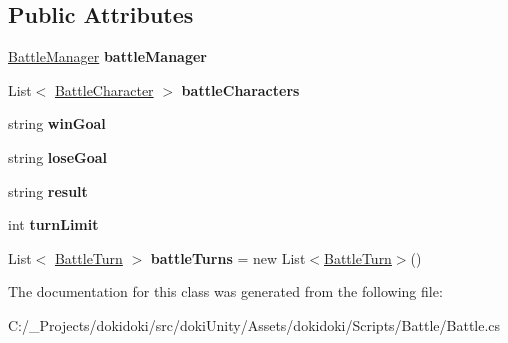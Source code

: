 \subsection*{Public Attributes}
\begin{DoxyCompactItemize}
\item 
\hyperlink{class_battle_manager}{Battle\+Manager} {\bfseries battle\+Manager}\hypertarget{class_battle_a214df3ebf52cf6a9a68e36780d6d0c4d}{}\label{class_battle_a214df3ebf52cf6a9a68e36780d6d0c4d}

\item 
List$<$ \hyperlink{class_battle_character}{Battle\+Character} $>$ {\bfseries battle\+Characters}\hypertarget{class_battle_a74798e30b7e446f9d0765e567b626357}{}\label{class_battle_a74798e30b7e446f9d0765e567b626357}

\item 
string {\bfseries win\+Goal}\hypertarget{class_battle_ae254298ae01b8d5a1205caa561315756}{}\label{class_battle_ae254298ae01b8d5a1205caa561315756}

\item 
string {\bfseries lose\+Goal}\hypertarget{class_battle_a297640a7cb13d282fddc16d08789ddb2}{}\label{class_battle_a297640a7cb13d282fddc16d08789ddb2}

\item 
string {\bfseries result}\hypertarget{class_battle_a9fef19df36c11da3c701323027766fdd}{}\label{class_battle_a9fef19df36c11da3c701323027766fdd}

\item 
int {\bfseries turn\+Limit}\hypertarget{class_battle_a2dc0c761ecf0ab97673d7eb867dc45a0}{}\label{class_battle_a2dc0c761ecf0ab97673d7eb867dc45a0}

\item 
List$<$ \hyperlink{class_battle_turn}{Battle\+Turn} $>$ {\bfseries battle\+Turns} = new List$<$\hyperlink{class_battle_turn}{Battle\+Turn}$>$()\hypertarget{class_battle_ac32ed72ce6859ed2c20211354b58a946}{}\label{class_battle_ac32ed72ce6859ed2c20211354b58a946}

\end{DoxyCompactItemize}


The documentation for this class was generated from the following file\+:\begin{DoxyCompactItemize}
\item 
C\+:/\+\_\+\+Projects/dokidoki/src/doki\+Unity/\+Assets/dokidoki/\+Scripts/\+Battle/Battle.\+cs\end{DoxyCompactItemize}
